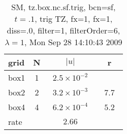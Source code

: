 \begin{table}[hbt]\tableFont %
\begin{center}
\begin{tabular}{|l|c|c|c|} \hline 
grid  & N &  $\vert u \vert$   & r \\ \hline 
                box1 &     1 & ~$2.5\times10^{ -2}$~ &            \\ \hline
                box2 &     2 & ~$3.2\times10^{ -3}$~ & ~$  7.7$~  \\ \hline
                box4 &     4 & ~$6.2\times10^{ -4}$~ & ~$  5.2$~  \\ \hline
    rate             &       &       $2.66$         &        \\ \hline
\end{tabular}
\caption{SM, tz.box.nc.sf.trig, bcn=sf, $t=.1$, trig TZ, fx=1, fx=1, diss=.0, filter=1, filterOrder=6, $\lambda=1$, Mon Sep 28 14:10:43 2009}\label{table:tz.box.nc.sf.trig}
\end{center}
\end{table}
